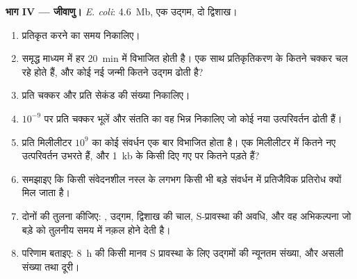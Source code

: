 \begin{problem}
\medskip
\noindent\textbf{भाग IV --- जीवाणु।}
\emph{E. coli}: \qty{4.6}{Mb}, एक उद्गम, दो द्विशाख।
\begin{enumerate}[resume]
  \item {} प्रतिकृत करने का समय निकालिए।
  \item समृद्ध माध्यम में  हर \qty{20}{min} में विभाजित होती है।
        एक साथ प्रतिकृतिकरण के कितने चक्कर चल रहे होते हैं, और कोई नई
        जन्मी  कितने उद्गम ढोती है?
  \item प्रति चक्कर और प्रति सेकंड  की संख्या निकालिए।
  \item $10^{-9}$ पर प्रति चक्कर भूलें और संतति  का वह भिन्न
        निकालिए जो कोई नया उत्परिवर्तन ढोती हैं।
  \item प्रति मिलीलीटर $10^9$  का कोई संवर्धन एक बार विभाजित
        होता है। एक मिलीलीटर में कितने नए उत्परिवर्तन उभरते हैं, और
        \qty{1}{kb} के किसी दिए गए  पर कितने पड़ते हैं?
  \item समझाइए कि किसी संवेदनशील नस्ल के लगभग किसी भी बड़े संवर्धन में
        प्रतिजैविक प्रतिरोध क्यों मिल जाता है।
  \item दोनों  की तुलना कीजिए: , उद्गम, द्विशाख की चाल,
        S-प्रावस्था की अवधि, और वह अभिकल्पना जो बड़े  को तुलनीय
        समय में नक़ल होने देती है।
  \item परिणाम बताइए: \qty{8}{h} की किसी मानव S प्रावस्था के लिए
        उद्गमों की न्यूनतम संख्या, और असली संख्या तथा दूरी।
\end{enumerate}
\end{problem}
